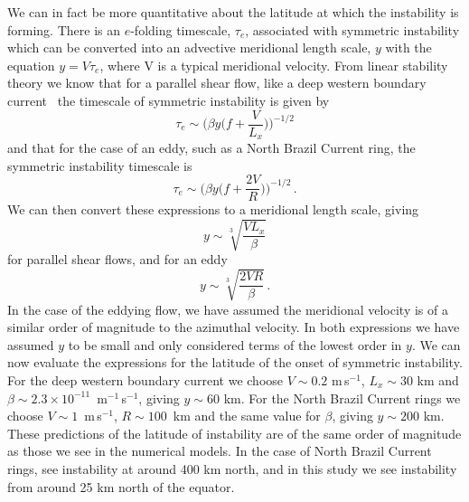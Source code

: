 We can in fact be more quantitative about the latitude at which the instability is forming. There is an $e$-folding timescale, $\tau_e$, associated with symmetric instability which can be converted into an advective meridional length scale, $y$ with the equation $y = V \tau_e$, where V is a typical meridional velocity. From linear stability theory we know that for a parallel shear flow, like a deep western boundary current~\citep{Hoskins1974} the timescale of symmetric instability is given by
\begin{equation}
    \tau_e \sim \Bigg(\beta y \bigg(f + \frac{V}{L_x}\bigg) \Bigg)^{-1/2}
\end{equation}
and that for the case of an eddy, such as a North Brazil Current ring, the symmetric instability timescale is~\citep{Buckingham2021}
\begin{equation}
    \tau_e \sim \Bigg(\beta y \bigg(f + \frac{2 V}{R}\bigg) \Bigg)^{-1/2} \, .
\end{equation}
We can then convert these expressions to a meridional length scale, giving
\begin{equation}
    y \sim \sqrt[3]{\frac{V L_x}{\beta}}
    \label{eq:dwbc_y}
\end{equation}
for parallel shear flows, and for an eddy
\begin{equation}
    y \sim \sqrt[3]{\frac{2 V R}{\beta}} \, .
    \label{eq:nbc_y}
\end{equation}
In the case of the eddying flow, we have assumed the meridional velocity is of a similar order of magnitude to the azimuthal velocity. In both expressions we have assumed $y$ to be small and only considered terms of the lowest order in $y$. We can now evaluate the expressions for the latitude of the onset of symmetric instability. For the deep western boundary current we choose $V \sim 0.2$ m\,s$^{-1}$, $L_x \sim 30$ km and $\beta \sim 2.3 \times 10^{-11}$~m$^{-1}$\,s$^{-1}$, giving $y \sim 60$ km. For the North Brazil Current rings we choose $V \sim 1$~m\,s$^{-1}$, $R \sim 100$~km and the same value for $\beta$, giving $y \sim 200$ km. These predictions of the latitude of instability are of the same order of magnitude as those we see in the numerical models. In the case of North Brazil Current rings, \citet{Goldsworth2021} see instability at around 400 km north, and in this study we see instability from around 25 km north of the equator.


